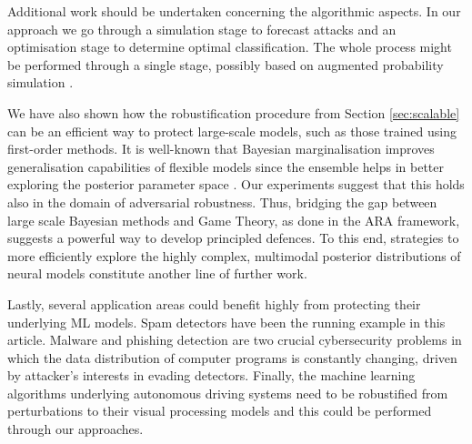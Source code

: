 

Additional work should be undertaken concerning the
algorithmic aspects.  In our approach  we go through a simulation stage to forecast attacks and an optimisation stage to determine optimal classification. The whole process might be performed through a single stage, possibly based on augmented probability simulation \cite{ekin2019augmented}.

We have also shown how the robustification procedure from Section \ref{sec:scalable} can be an efficient way to protect large-scale models, such as those trained using first-order methods. It is well-known that Bayesian marginalisation improves generalisation capabilities of flexible models since the ensemble helps in better exploring the posterior parameter space \cite{wilson2020bayesian}. Our experiments suggest 
that this holds also in the domain of adversarial robustness. Thus, bridging the gap between large scale Bayesian methods and Game Theory, as  done in the ARA framework, suggests a powerful way to develop principled defences. To this end, strategies to more efficiently explore the highly complex, multimodal posterior distributions of neural models constitute another line of further work.

Lastly, several application areas could benefit highly from
protecting their underlying ML models. Spam detectors have been
the running example in this article. Malware and phishing detection are two
crucial cybersecurity problems in which the data distribution of computer programs is constantly changing, driven by attacker's interests in evading detectors. Finally, the machine learning algorithms underlying 
autonomous driving systems need to be robustified from perturbations to their visual processing models and this could be performed through our 
approaches.



